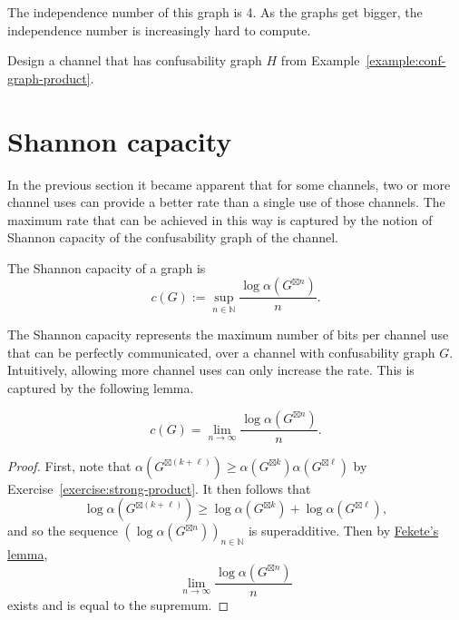 \begin{example}
\begin{center}
\end{center}
The independence number of this graph is 4. As the graphs get bigger, the independence number is increasingly hard to compute.
\end{example}

\begin{exercise}
Design a channel that has confusability graph $H$ from Example~\ref{example:conf-graph-product}.
\end{exercise}


\section{Shannon capacity}
In the previous section it became apparent that for some channels, two or more channel uses can provide a better rate than a single use of those channels. The maximum rate that can be achieved in this way is captured by the notion of Shannon capacity of the confusability graph of the channel.
\begin{definition}
The Shannon capacity of a graph is \[c(G) := \sup_{n \in \mathbb{N}} \frac{\log \alpha(G^{\boxtimes n})}{n}.\]
\end{definition}
The Shannon capacity represents the maximum number of bits per channel use that can be perfectly communicated, over a channel with confusability graph $G$. Intuitively, allowing more channel uses can only increase the rate. This is captured by the following lemma.

\begin{proposition}
\[
c(G) = \lim_{n \to \infty} \frac{\log \alpha(G^{\boxtimes n})}{n}.
\]
\end{proposition}
\begin{proof}
First, note that $\alpha(G^{\boxtimes (k+\ell)}) \geq \alpha(G^{\boxtimes k})\alpha(G^{\boxtimes \ell})$ by Exercise~\ref{exercise:strong-product}. It then follows that
\[
\log \alpha(G^{\boxtimes(k+\ell)}) \geq \log \alpha(G^{\boxtimes k}) + \log \alpha(G^{\boxtimes \ell}),
\]
and so the sequence $(\log \alpha(G^{\boxtimes n}))_{n \in \mathbb{N}}$ is superadditive. Then by \href{https://en.wikipedia.org/wiki/Superadditivity}{Fekete's lemma},
\[
\lim_{n \to \infty} \frac{\log \alpha(G^{\boxtimes n})}{n}
\]
exists and is equal to the supremum.
\end{proof}

